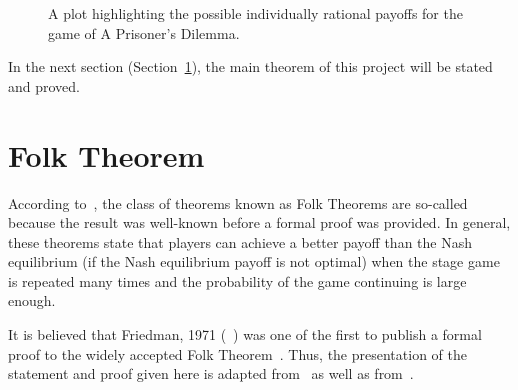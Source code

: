\begin{figure}
    \caption{A plot highlighting the possible individually rational payoffs for the game of A Prisoner's Dilemma.}\label{fig:Feasible_Payoff_Plot}
\end{figure}

In the next section (Section~\ref{sec:Folk_Thm}), the main theorem of this
project will be stated and proved.

\section{Folk Theorem}\label{sec:Folk_Thm}
According to~\cite{Webb2007}, the class of theorems known as Folk Theorems are
so-called because the result was well-known before a formal proof was provided.
In general, these theorems state that players can achieve a better payoff than
the Nash equilibrium (if the Nash equilibrium payoff is not optimal) when the
stage game is repeated many times and the probability of the game continuing is 
large enough. 

It is believed that Friedman, 1971 (~\cite{friedman1971non}) was one of the
first to publish a formal proof to the widely accepted Folk Theorem~\cite{}.
Thus, the presentation of the statement and proof given here is adapted
from~\cite{friedman1971non} as well as from~\cite{Knight2017b}.

